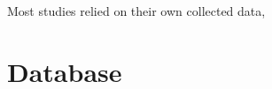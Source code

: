 \documentclass[informationsecurity]{gucmasterproject}
\begin{document}
Most studies relied on their own collected data, 


\section{Database}



\end{document}
